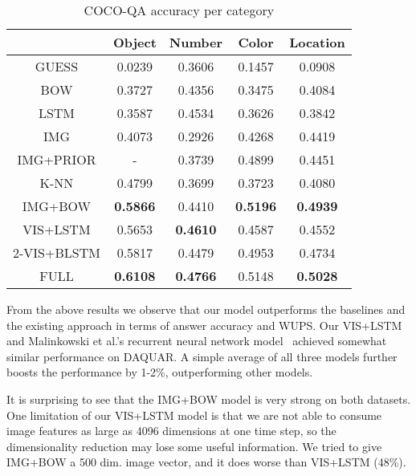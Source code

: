\documentclass{article} \usepackage{nips15submit_e,times}
\renewcommand{\#}[1]{\textbf{#1}}
\begin{document}
\begin{table}[h]
\caption{COCO-QA accuracy per category}
\label{tab:cocoqa_acc_breakdown}
\begin{center}
\begin{small}
\begin{sc}
\begin{tabular}{c c c c c}
\hline
           &   Object  &   Number &   Color   & Location \\
\hline
GUESS      &   0.0239  &   0.3606 &   0.1457  & 0.0908   \\
BOW        &   0.3727  &   0.4356 &   0.3475  & 0.4084   \\
LSTM       &   0.3587  &   0.4534 &   0.3626  & 0.3842   \\
IMG        &   0.4073  &   0.2926 &   0.4268  & 0.4419   \\
IMG+PRIOR  &   -       &   0.3739 &   0.4899  & 0.4451   \\
K-NN       &   0.4799  &   0.3699 &   0.3723  & 0.4080   \\
IMG+BOW    &\#{0.5866} &   0.4410 &\#{0.5196} &\#{0.4939}\\
VIS+LSTM   &   0.5653  &\#{0.4610}&   0.4587  & 0.4552   \\
2-VIS+BLSTM&   0.5817  &   0.4479 &   0.4953  & 0.4734   \\
FULL       &\#{0.6108} &\#{0.4766}&   0.5148  &\#{0.5028}\\
\hline
\end{tabular}
\end{sc}
\end{small}
\end{center}
\end{table}

From the above results we observe that our model outperforms the baselines and
the existing approach in terms of answer accuracy and WUPS. Our VIS+LSTM and
Malinkowski et al.'s recurrent neural network model~\cite{malinowski15} achieved
somewhat similar performance on DAQUAR. A simple average of all three models
further boosts the performance by 1-2\%, outperforming other models.

It is surprising to see that the IMG+BOW model is very strong on both datasets. One
limitation of our VIS+LSTM model is that we are not able to consume image
features as large as 4096 dimensions at one time step, so the dimensionality
reduction may lose some useful information. We tried to give IMG+BOW a 500 dim.
image vector, and it does worse than VIS+LSTM (48\%). 
\end{document}
